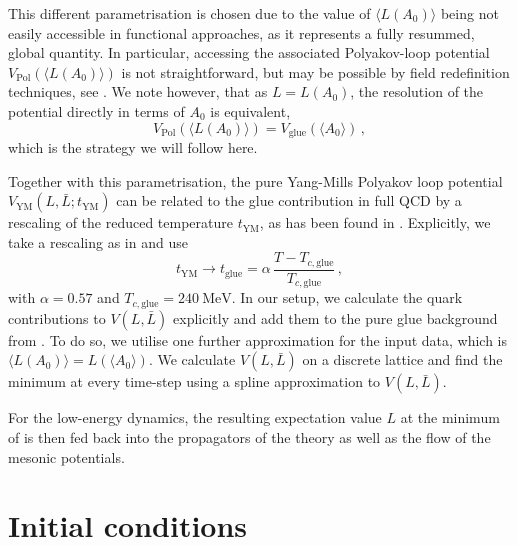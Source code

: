 \documentclass[10pt,prd,superscriptaddress,twocolumn]{revtex4-2}
\begin{document}
This different parametrisation is chosen due to the value of $\langle L(A_0) \rangle$ being not easily accessible in functional approaches, as it represents a fully resummed, global quantity. In particular, accessing the associated Polyakov-loop potential $V_\textrm{Pol}(\langle L(A_0) \rangle)$ is not straightforward, but may be possible by field redefinition techniques, see \cite{Ihssen:2024ihp}. We note however, that as $L = L(A_0)$, the resolution of the potential directly in terms of $A_0$ is equivalent, 
%
\begin{equation}
	V_\textrm{Pol}(\langle L(A_0) \rangle) = V_\textrm{glue}(\langle A_0 \rangle)
	\,,
\end{equation}
%
which is the strategy we will follow here.

Together with this parametrisation, the pure Yang-Mills Polyakov loop potential $V_\textrm{YM}(L,\bar{L}; t_\textrm{YM})$ can be related to the glue contribution in full {QCD} by a rescaling of the reduced temperature $t_\textrm{YM}$, as has been found in \cite{Herbst:2015ona, Haas:2013qwp}. Explicitly, we take a rescaling as in \cite{Herbst:2015ona, Fu:2019hdw} and use
%
\begin{equation}
	t_\textrm{YM} \to t_\textrm{glue} = \alpha\,\frac{T-T_{c,\textrm{glue}}}{T_{c,\textrm{glue}}}
	\,,
\end{equation}
%
with $\alpha=0.57$ and $T_{c,\textrm{glue}} = \qty{240}{\MeV}$.
In our setup, we calculate the quark contributions to $V(L,\bar{L})$ explicitly and add them to the pure glue background from \cite{Lo:2013hla}.
To do so, we utilise one further approximation for the input data, which is 
$\langle L(A_0) \rangle = L(\langle A_0 \rangle)$. We calculate $V(L,\bar{L})$ on a discrete lattice and find the minimum at every time-step using a spline approximation to $V(L,\bar{L})$.

For the low-energy dynamics, the resulting expectation value $L$ at the minimum of is then fed back into the propagators of the theory as well as the flow of the mesonic potentials.


\section{Initial conditions}
\label{sec:QCDPD_initial_detail}
\end{document}
